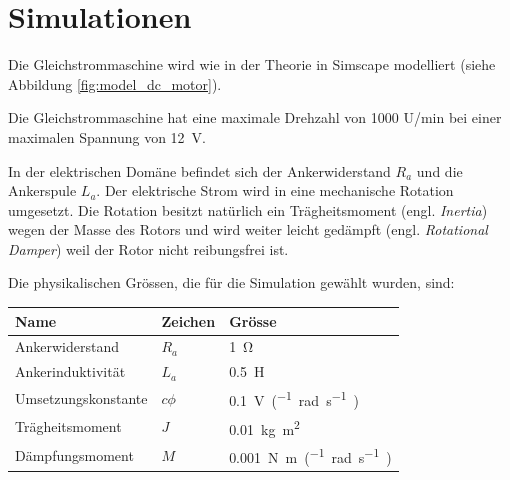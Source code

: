 \section{Simulationen}

Die Gleichstrommaschine wird wie in  der Theorie in Simscape modelliert (siehe
Abbildung  \ref{fig:model_dc_motor}).

Die Gleichstrommaschine hat eine maximale Drehzahl von 1000  U/min  bei  einer
maximalen Spannung von \SI{12}{\volt}.

In der elektrischen Dom\"ane befindet sich der Ankerwiderstand  $R_a$  und die
Ankerspule $L_a$. Der elektrische Strom  wird  in  eine  mechanische  Rotation
umgesetzt. Die  Rotation  besitzt  nat\"urlich  ein  Tr\"agheitsmoment  (engl.
\textit{Inertia})  wegen  der  Masse  des  Rotors   und   wird  weiter leicht
ged\"ampft  (engl.   \textit{Rotational   Damper})   weil   der   Rotor  nicht
reibungsfrei ist.

Die physikalischen Gr\"ossen, die f\"ur die Simulation gew\"ahlt wurden, sind:

\begin{threeparttable}
    \centering
    \begin{tabular}{lll}
        \toprule
        Name                   & Zeichen & Gr\"osse \\
        \midrule
        Ankerwiderstand        & $R_a$   & \SI{1}{\ohm} \\
        Ankerinduktivit\"at    & $L_a$   & \SI{0.5}{\henry} \\
        Umsetzungskonstante    & $c\phi$ & \SI{0.1}{\volt\per(\radian\per\second)} \\
        Tr\"agheitsmoment      & $J$     & \SI{0.01}{\kilo\gram\meter\squared} \\
        D\"ampfungsmoment      & $M$     & \SI{0.001}{\newton\meter\per(\radian\per\second)} \\
        \bottomrule
    \end{tabular}
    \caption{}
    \label{tab:dc_motor_values}
\end{threeparttable}

